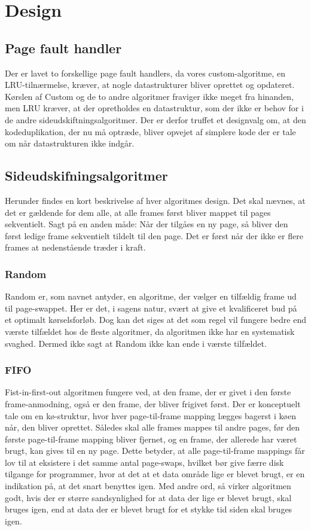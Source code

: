 \section{Design}
\label{sec:design}

\subsection{Page fault handler}
Der er lavet to forskellige page fault handlers, da vores custom-algoritme, en LRU-tilnærmelse, kræver, at nogle datastrukturer bliver oprettet og opdateret. Kørslen af Custom og de to andre algoritmer fraviger ikke meget fra hinanden, men LRU kræver, at der opretholdes en datastruktur, som der ikke er behov for i de andre sideudskiftningsalgoritmer. Der er derfor truffet et designvalg om, at den kodeduplikation, der nu må optræde, bliver opvejet af simplere kode der er tale om når datastrukturen ikke indgår.  

\subsection{Sideudskifningsalgoritmer}
Herunder findes en kort beskrivelse af hver algoritmes design. Det skal nævnes, at det er gældende for dem alle, at alle frames først bliver mappet til pages sekventielt. Sagt på en anden måde: Når der tilgåes en ny page, så bliver den først ledige frame sekventielt tildelt til den page. Det er først når der ikke er flere frames at nedenstående træder i kraft.

	\subsubsection{Random}
	Random er, som navnet antyder, en algoritme, der vælger en tilfældig frame ud til page-swappet. Her er det, i sagens natur, svært at give et kvalificeret bud på et optimalt kørselsforløb. Dog kan det siges at det som regel vil fungere bedre end værste tilfældet hos de fleste algoritmer, da algoritmen ikke har en systematisk svaghed. Dermed ikke sagt at Random ikke kan ende i værste tilfældet. 
	
	\subsubsection{FIFO}
	Fist-in-first-out algoritmen fungere ved, at den frame, der er givet i den første frame-anmodning, også er den frame, der bliver frigivet først. Der er konceptuelt tale om en kø-struktur, hvor hver page-til-frame mapping lægges bagerst i køen når, den bliver oprettet. Således skal alle frames mappes til andre pages, før den første page-til-frame mapping bliver fjernet, og en frame, der allerede har været brugt, kan gives til en ny page. Dette betyder, at alle page-til-frame mappings får lov til at eksistere i det samme antal page-swaps, hvilket bør give færre disk tilgange for programmer, hvor at det at et data område lige er blevet brugt, er en indikation på, at det snart benyttes igen. Med andre ord, så virker algoritmen godt, hvis der er større sandsynlighed for at data der lige er blevet brugt, skal bruges igen, end at data der er blevet brugt for et stykke tid siden skal bruges igen.

